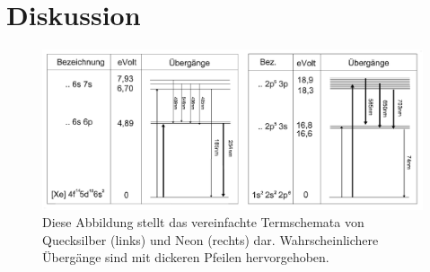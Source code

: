 \section{Diskussion}
	
	\begin{figure}[ht]
		\centering
		\includegraphics[width=\textwidth]{bilder/Uebergaenge.png}
		\caption{Diese Abbildung stellt das vereinfachte Termschemata von Quecksilber (links) und Neon (rechts) dar. Wahrscheinlichere Übergänge sind mit dickeren Pfeilen hervorgehoben.\cite{WWU}}
		\label{fig:Übergänge}	
	\end{figure}	

	
